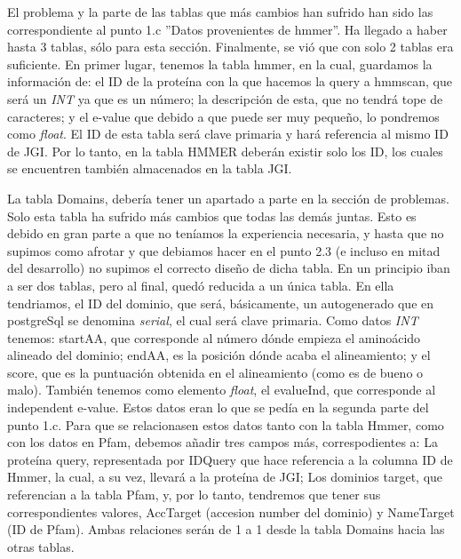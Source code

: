 \documentclass[11pt]{article} %
\begin{document}
El problema y la parte de las tablas que m\'as cambios han sufrido han sido las  correspondiente al punto 1.c ''Datos provenientes de hmmer''. Ha llegado a haber hasta 3 tablas, s\'olo para esta secci\'on. Finalmente, se vi\'o que con solo 2 tablas era suficiente. En primer lugar, tenemos la tabla hmmer, en la cual, guardamos la informaci\'on de: el ID de la prote\'ina con la que hacemos la query a hmmscan, que ser\'a un \emph{INT} ya que es un n\'umero; la descripci\'on de esta, que no tendr\'a  tope de caracteres; y el e-value que debido a que puede ser muy peque\~no, lo pondremos como \emph{float}. El ID de esta tabla ser\'a clave primaria y har\'a referencia al mismo ID de JGI. Por lo tanto, en la tabla HMMER deber\'an existir solo los ID, los cuales se encuentren tambi\'en almacenados en la tabla JGI. 

La tabla Domains, deber\'ia tener un apartado a parte en la secci\'on de problemas. Solo esta tabla ha sufrido m\'as cambios que todas las dem\'as juntas. Esto es debido en gran parte a que no ten\'iamos la experiencia necesaria, y hasta que no supimos como afrotar y que debiamos hacer en el punto 2.3 (e incluso en mitad del desarrollo) no supimos el correcto dise\~no de dicha tabla. En un principio iban a ser dos tablas, pero al final, qued\'o reducida a un \'unica tabla. En ella tendriamos, el ID del dominio, que ser\'a, b\'asicamente, un autogenerado que en postgreSql se denomina \emph{serial}, el cual ser\'a clave primaria. Como datos \emph{INT} tenemos: startAA, que corresponde al n\'umero d\'onde empieza el amino\'acido alineado del dominio; endAA, es la posici\'on d\'onde acaba el alineamiento; y el score, que es la puntuaci\'on obtenida en el alineamiento (como es de bueno o malo). Tambi\'en tenemos como elemento \emph{float}, el evalueInd, que corresponde al independent e-value. Estos datos eran lo que se ped\'ia en la segunda parte del punto 1.c. Para que se relacionasen estos datos tanto con la tabla Hmmer, como con los datos en Pfam, debemos a\~nadir tres campos m\'as, correspodientes a: La prote\'ina query, representada por IDQuery que hace referencia a la columna ID de Hmmer, la cual, a su vez, llevar\'a a la prote\'ina de JGI; Los dominios target, que referencian a la tabla Pfam, y, por lo tanto, tendremos que tener sus correspondientes valores, AccTarget (accesion number del dominio) y NameTarget (ID de Pfam). Ambas relaciones ser\'an de 1 a 1 desde la tabla Domains hacia las otras tablas.
\end{document}

